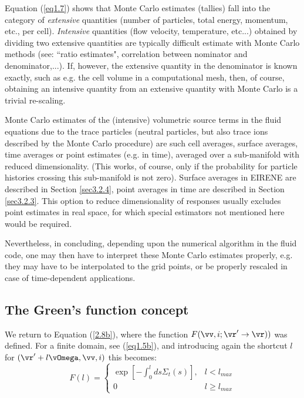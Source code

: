 Equation (\ref{eq1.7}) shows that Monte Carlo estimates (tallies) fall into the category of \emph{extensive} quantities
(number of particles, total energy, momentum, etc., per cell). \emph{Intensive }quantities  (flow velocity, temperature, etc...)
obtained by dividing two extensive quantities are typically difficult estimate with Monte Carlo methods
(see: ``ratio estimates", correlation between nominator and denominator,...).
If, however, the extensive quantity in the denominator is known exactly, such as e.g. the cell volume in a computational mesh, then, of course,
obtaining an intensive quantity from an extensive quantity with Monte Carlo is a trivial re-scaling.

Monte Carlo estimates of the (intensive) volumetric source terms in the fluid
equations due to the trace particles (neutral particles, but also
trace ions described by the Monte Carlo procedure) are such
cell averages, surface averages, time averages or point estimates (e.g. in time),
averaged over a sub-manifold with reduced dimensionality. (This works, of course, only if the probability
for particle histories crossing this sub-manifold is not zero).
Surface averages in EIRENE are described in Section \ref{sec3.2.4}, point averages in time
are described in Section \ref{sec3.2.3}.
This option to reduce dimensionality of responses usually excludes point estimates in real space,
for which special estimators not mentioned here would be required.

Nevertheless, in concluding, depending upon the numerical algorithm in the
fluid code, one may then have to interpret these Monte Carlo estimates properly, e.g.
they may have to be interpolated to the grid points, or be properly rescaled in case of time-dependent applications.

\subsection{The Green's function concept}\label{sec_green}
We return to Equation (\ref{2.8b}), where the function $F(\vv,i;\vr'\rightarrow \vr))$ was defined.
For a finite domain, see (\ref{eq1.5b}), and introducing again the shortcut $l$ for $(\vr'+l\vOmega,\vv,i)$
this becomes:
\begin{equation}
F(l) = \left\{
\begin{array}{lr}
\exp \left [   - \int_{0}^{l} ds \Sigma_t ( s
 )  \right ],                  &   l<l_{max}  \\
0                      &   l\ge l_{max}
\end{array}
\right.
\end{equation}

